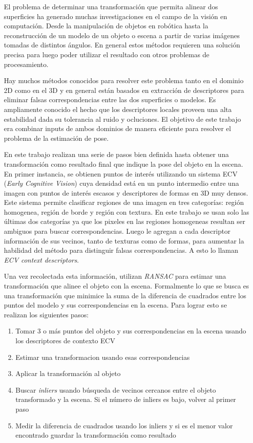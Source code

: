 El problema de determinar una transformación que permita alinear dos superficies ha generado muchas investigaciones en el campo de la visión en computación. Desde la manipulación de objetos en robótica hasta la reconstrucción de un modelo de un objeto o escena a partir de varias imágenes tomadas de distintos ángulos. En general estos métodos requieren una solución precisa para luego poder utilizar el resultado con otros problemas de procesamiento.

Hay muchos métodos conocidos para resolver este problema tanto en el dominio 2D como en el 3D y en general están basados en extracción de descriptores para eliminar falsas correspondencias entre las dos superficies o modelos. Es ampliamente conocido el hecho que los descriptores locales proveen una alta estabilidad dada su tolerancia al ruido y ocluciones. El objetivo de este trabajo era combinar inputs de ambos dominios de manera eficiente para resolver el problema de la estimación de pose.

En este trabajo realizan una serie de pasos bien definida hasta obtener una transformación como resultado final que indique la pose del objeto en la escena. En primer instancia, se obtienen puntos de interés utilizando un sistema ECV (\textit{Early Cognitive Vision}) cuya densidad está en un punto intermedio entre una imagen con puntos de interés escasos y descriptores de formas en 3D muy densos. Este sistema permite clasificar regiones de una imagen en tres categorías: región homogenea, región de borde y región con textura. En este trabajo se usan solo las últimas dos categorías ya que los pixeles en las regiones homogeneas resultan ser ambiguos para buscar correspondencias. Luego le agregan a cada descriptor información de sus vecinos, tanto de texturas como de formas, para aumentar la habilidad del método para distinguir falsas correspondencias. A esto lo llaman \textit{ECV context descriptors}.

Una vez recolectada esta información, utilizan \textit{RANSAC} para estimar una transformación que alinee el objeto con la escena. Formalmente lo que se busca es una transformación que minimice la suma de la diferencia de cuadrados entre los puntos del modelo y sus correspondencias en la escena. Para lograr esto se realizan los siguientes pasos:
\begin{enumerate}
	\item Tomar 3 o más puntos del objeto y sus correspondencias en la escena usando los descriptores de contexto ECV
	\item Estimar una transformacion usando esas correspondencias
	\item Aplicar la transformación al objeto
	\item Buscar \textit{inliers} usando búsqueda de vecinos cercanos entre el objeto transformado y la escena. Si el número de inliers es bajo, volver al primer paso
	\item Medir la diferencia de cuadrados usando los inliers y si es el menor valor encontrado guardar la transformación como resultado
\end{enumerate}


